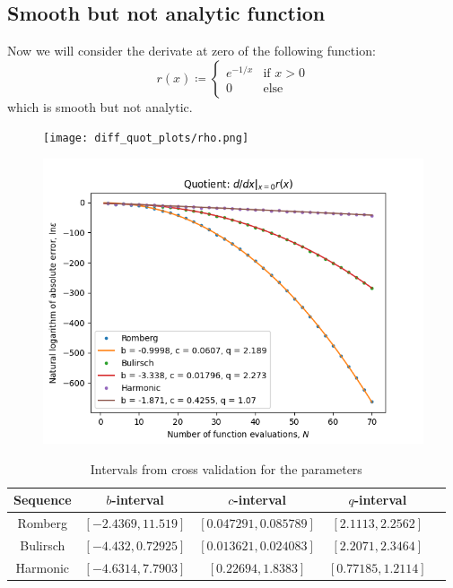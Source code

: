 \subsection{Smooth but not analytic function}

Now we will consider the derivate at zero of the following function:
\[
r(x) \coloneqq \begin{cases}
e^{-1/x} & \text{if } x > 0\\
0 & \text{else}
\end{cases}
\]
which is smooth but not analytic.

\begin{figure}[H]
\centering
\begin{minipage}{0.45\textwidth}
\centering
\texttt{[image: diff\_quot\_plots/rho.png]}
\end{minipage}
\begin{minipage}{0.45\textwidth}
\centering
\includegraphics[scale=0.45]{diff_quot_plots/rho_hp_trend.png}
\end{minipage}
\end{figure}

\begin{table}[H]
    \centering
    \begin{tabular}{c|c||c|c|c}
Sequence & \(b\)-interval & \(c\)-interval & \(q\)-interval\\\hline\hline
Romberg &\([-2.4369, 11.519]\) & \([0.047291, 0.085789]\) & \([2.1113, 2.2562]\)\\
Bulirsch & \([-4.432, 0.72925]\) & \([0.013621, 0.024083]\) & \([2.2071, 2.3464]\)\\
Harmonic & \([-4.6314, 7.7903]\) & \([0.22694, 1.8383]\) & \([0.77185, 1.2114]\)\\
    \end{tabular}
    \caption{Intervals from cross validation for the parameters}
    \label{tab:my_label}
\end{table}

